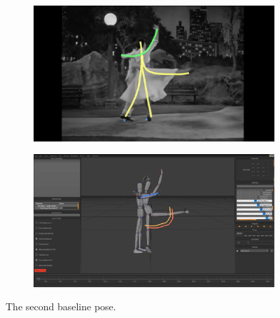\begin{figure}[h!]
	\centering
        \begin{subfigure}[b!]{0.45\textwidth}
        	\centering
                \includegraphics[width=\linewidth]{img/keyframe_case_8_(4)}
        \end{subfigure}
        \quad
        \begin{subfigure}[b!]{0.45\textwidth}
        	\centering
                \includegraphics[width=\linewidth]{img/baselinepose2}
        \end{subfigure}%
        \caption{The second baseline pose.}
	\label{fig:bpose2}
\end{figure}

